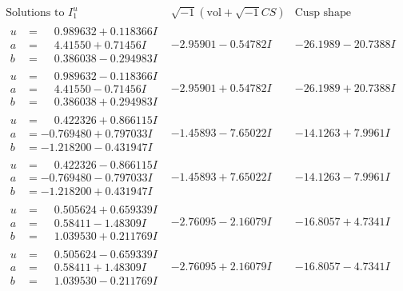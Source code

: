 \documentclass[1p]{elsarticle_modified}
\theoremstyle{definition}
\newcommand{\I}{\sqrt{-1}}
\begin{document}
$$\begin{array}{c|c|c}  
\text{Solutions to }I^u_{1}& \I (\text{vol} + \sqrt{-1}CS) & \text{Cusp shape}\\
 \hline 
\begin{aligned}
u &= \phantom{-}0.989632 + 0.118366 I \\
a &= \phantom{-}4.41550 + 0.71456 I \\
b &= \phantom{-}0.386038 - 0.294983 I\end{aligned}
 & -2.95901 - 0.54782 I & -26.1989 - 20.7388 I \\ \hline\begin{aligned}
u &= \phantom{-}0.989632 - 0.118366 I \\
a &= \phantom{-}4.41550 - 0.71456 I \\
b &= \phantom{-}0.386038 + 0.294983 I\end{aligned}
 & -2.95901 + 0.54782 I & -26.1989 + 20.7388 I \\ \hline\begin{aligned}
u &= \phantom{-}0.422326 + 0.866115 I \\
a &= -0.769480 + 0.797033 I \\
b &= -1.218200 - 0.431947 I\end{aligned}
 & -1.45893 - 7.65022 I & -14.1263 + 7.9961 I \\ \hline\begin{aligned}
u &= \phantom{-}0.422326 - 0.866115 I \\
a &= -0.769480 - 0.797033 I \\
b &= -1.218200 + 0.431947 I\end{aligned}
 & -1.45893 + 7.65022 I & -14.1263 - 7.9961 I \\ \hline\begin{aligned}
u &= \phantom{-}0.505624 + 0.659339 I \\
a &= \phantom{-}0.58411 - 1.48309 I \\
b &= \phantom{-}1.039530 + 0.211769 I\end{aligned}
 & -2.76095 - 2.16079 I & -16.8057 + 4.7341 I \\ \hline\begin{aligned}
u &= \phantom{-}0.505624 - 0.659339 I \\
a &= \phantom{-}0.58411 + 1.48309 I \\
b &= \phantom{-}1.039530 - 0.211769 I\end{aligned}
 & -2.76095 + 2.16079 I & -16.8057 - 4.7341 I \\ \hline\begin{aligned}

\end{aligned}
\end{array}$$
\end{document}
